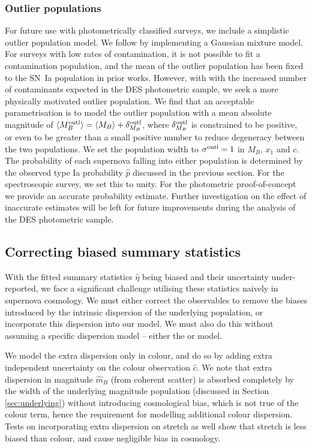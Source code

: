 \documentclass[a4paper,fleqn,usenatbib]{mnras}
\newcommand{\green}{\color{forestgreen}}
\newcommand{\gten}{\citetalias{Guy2010}}
\newcommand{\celeven}{\citetalias{Chotard2011}}
\newcommand{\rubin}{\citetalias{Rubin2015}}
\begin{document}
\subsubsection{Outlier populations}

For future use with photometrically classified surveys, we include a simplistic outlier population model. We follow {\rubin} \citep[and therefore ][]{Kunz2007} by implementing a Gaussian mixture model. For surveys with low rates of contamination, it is not possible to fit a contamination population, and the mean of the outlier population has been fixed to the SN~Ia population in prior works. However, with with the increased number of contaminants expected in the DES photometric sample, we seek a more physically motivated outlier population.  We find that an acceptable parametrisation is to model the outlier population with a mean absolute magnitude of $\langle M_B^{\rm outl} \rangle = \langle M_B \rangle + \delta_{M_B}^{\rm outl}$, where $\delta_{M_B}^{\rm outl}$ is constrained to be positive, or even to be greater than a small positive number to reduce degeneracy between the two populations. We set the population width to $\sigma^{\rm outl} = 1$ in $M_B$, $x_1$ and $c$. The probability of each supernova falling into either population is determined by the observed type Ia probability $\hat{p}$ discussed in the previous section. For the spectroscopic survey, we set this to unity. For the photometric proof-of-concept we provide an accurate probability estimate. Further investigation on the effect of inaccurate {\green estimates will be left for} future improvements during the analysis of the DES photometric sample.


\subsection{Correcting biased summary statistics}

With the {\green fitted summary statistics $\hat{\eta}$ being biased and their uncertainty under-reported, we face a significant challenge utilising these statistics naively in supernova cosmology}. We must either correct the observables to remove the biases introduced by the intrinsic dispersion of the underlying population, or incorporate this dispersion into our model. We must also do this without assuming a specific dispersion model -- either the {\gten} or {\celeven} model. 

We model the extra dispersion only in colour, and do so by adding extra independent uncertainty on the colour observation {\green $\hat{c}$}. We note that extra dispersion in magnitude {\green $\hat{m}_B$} (from coherent scatter) is absorbed completely by the width of the underlying magnitude population (discussed in Section \ref{sec:underlying}) without introducing cosmological bias, which is not true of the colour term, hence the requirement for modelling additional colour dispersion. Tests on incorporating extra dispersion on stretch as well show that stretch is less biased than colour, and cause negligible bias in cosmology.
\end{document}
